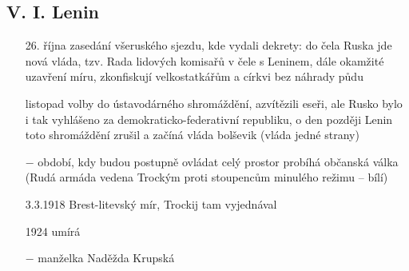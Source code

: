 \documentclass{article}
\begin{document}
\subsection*{V. I. Lenin}
\begin{itemize}
    \vspace{-0.5em}
    \setlength\itemsep{0.15em}
    \item[26. října] zasedání všeruského sjezdu, kde vydali dekrety: do čela Ruska jde nová vláda, tzv. Rada lidových komisařů v čele s Leninem, dále okamžité uzavření míru, zkonfiskují velkostatkářům a církvi bez náhrady půdu
    \item[listopad] volby do ústavodárného shromáždění, azvítězili eseři, ale Rusko bylo i tak vyhlášeno za demokraticko-federativní republiku, o den později Lenin toto shromáždění zrušil a začíná vláda bolševik (vláda jedné strany)
    \item[$-$] období, kdy budou postupně ovládat celý prostor probíhá občanská válka (Rudá armáda vedena Trockým proti stoupencům minulého režimu -- bílí)
    \item[3.3.1918] Brest-litevský mír, Trockij tam vyjednával
    \item[1924] umírá
    \item[$-$] manželka Naděžda Krupská  
\end{itemize}
\end{document}
